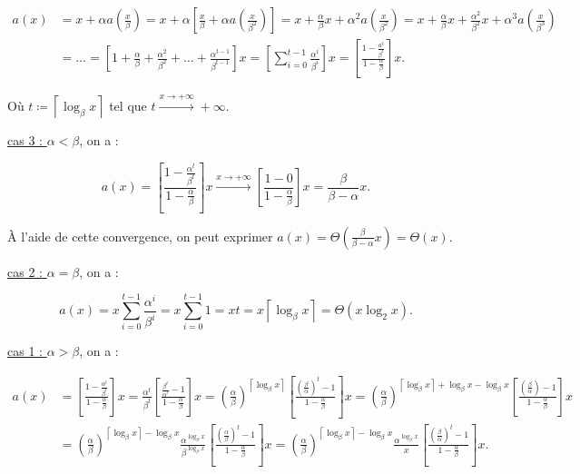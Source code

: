 \documentclass{article}
\newcommand{\ceil}[1]{{\left\lceil#1\right\rceil}}
\begin{document}
			\begin{align*}
				a(x) &= x + \alpha a\left(\frac x\beta\right) = x + \alpha\left[\frac x\beta + \alpha a\left(\frac x{\beta^2}\right)\right] = x + \frac \alpha\beta x + \alpha^2 a\left(\frac x{\beta^2}\right) = x + \frac \alpha\beta x + \frac {\alpha^2}{\beta^2}x + \alpha^3 a\left(\frac x{\beta^3}\right) \\
					 &= \ldots = \left[1 + \frac \alpha\beta + \frac {\alpha^2}{\beta^2} + \ldots + \frac {\alpha^{t-1}}{\beta^{t-1}}\right]x = \left[\sum_{i=0}^{t-1}\frac {\alpha^i}{\beta^i}\right]x = \left[\frac {1 - \frac {a^t}{\beta^t}}{1 - \frac \alpha\beta}\right]x.
			\end{align*}

			Où $t \coloneqq \ceil{\log_\beta x}$ tel que $t \stackrel{x\to+\infty}{\longrightarrow}+\infty$.

			\underline{cas 3 : } $\alpha < \beta$, on a :

			\[a(x) = \left[\frac {1 - \frac {\alpha^t}{\beta^t}}{1 - \frac \alpha\beta}\right]x \stackrel{x\to+\infty}\longrightarrow \left[\frac {1 - 0}{1 - \frac \alpha\beta}\right]x = \frac \beta{\beta - \alpha}x.\]

			À l'aide de cette convergence, on peut exprimer $a(x) = \Theta\left(\frac \beta{\beta-\alpha}x\right) = \Theta(x)$.

			\underline{cas 2 : } $\alpha= \beta$, on a :

			\[a(x) = x\sum_{i=0}^{t-1}\frac {\alpha^i}{\beta^i} = x\sum_{i=0}^{t-1}1 = xt =x\ceil{\log_\beta x} = \Theta(x\log_2 x).\]

			\underline {cas 1 : } $\alpha > \beta$, on a :

			\begin{align*}
				a(x) &= \left[\frac {1 - \frac {\alpha^t}{\beta^t}}{1 - \frac \alpha\beta}\right]x = \frac {\alpha^t}{\beta^t}\left[\frac {\frac {\beta^t}{\alpha^t} - 1}{1 - \frac \alpha\beta}\right]x
				= \left(\frac \alpha\beta\right)^\ceil{\log_\beta x}\left[\frac {\left(\frac \beta\alpha\right)^t - 1}{1 - \frac \alpha\beta}\right]x 
				= \left(\frac \alpha\beta\right)^{\ceil{\log_\beta x} + \log_\beta x - \log_\beta x}\left[\frac {\left(\frac \beta\alpha\right) - 1}{1 - \frac \alpha\beta}\right]x \\
					 &= \left(\frac \alpha\beta\right)^{\ceil{\log_\beta x} - \log_\beta x}\frac {\alpha^{\log_\beta x}}{\beta^{\log_\beta x}}\left[\frac {\left(\frac \alpha\beta\right)^t - 1}{1 - \frac \alpha\beta}\right]x = \left(\frac \alpha\beta\right)^{\ceil{\log_\beta x} - \log_\beta x}\frac {\alpha^{\log_\beta x}}x\left[\frac {\left(\frac \beta\alpha\right)^t - 1}{1-\frac \alpha\beta}\right]x.
			\end{align*}
\end{document}
